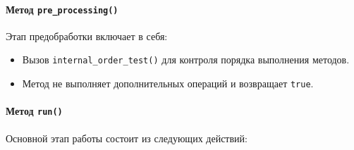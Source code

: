 \documentclass[12pt]{article}
\begin{document}
\paragraph{Метод \texttt{pre\_processing()}}
Этап предобработки включает в себя:
\begin{itemize}
    \item Вызов \texttt{internal\_order\_test()} для контроля порядка выполнения методов.
    \item Метод не выполняет дополнительных операций и возвращает \texttt{true}.
\end{itemize}

\paragraph{Метод \texttt{run()}}
Основной этап работы состоит из следующих действий:
\end{document}

